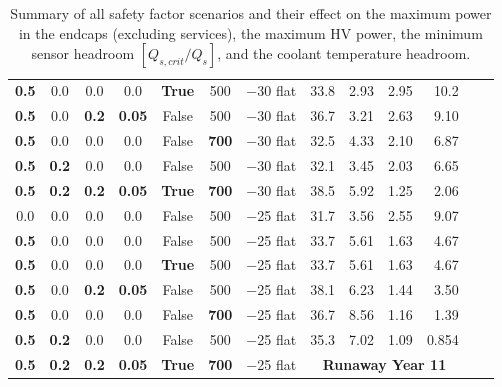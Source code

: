 \begin{table}[ht]
\begin{centering}
{\begin{tabular}{|ccccc|cc|rrrr|r|r|}
{\bf 0.5} & 0.0       & 0.0       & 0.0        & {\bf True} & 500       & $-$30 flat &      33.8 &    2.93 &      2.95 &       10.2 \\
{\bf 0.5} & 0.0       & {\bf 0.2} & {\bf 0.05} & False      & 500       & $-$30 flat &      36.7 &    3.21 &      2.63 &       9.10 \\
{\bf 0.5} & 0.0       & 0.0       & 0.0        & False      & {\bf 700} & $-$30 flat &      32.5 &    4.33 &      2.10 &       6.87 \\
{\bf 0.5} & {\bf 0.2} & 0.0       & 0.0        & False      & 500       & $-$30 flat &      32.1 &    3.45 &      2.03 &       6.65 \\
{\bf 0.5} & {\bf 0.2} & {\bf 0.2} & {\bf 0.05} & {\bf True} & {\bf 700} & $-$30 flat &      38.5 &    5.92 &      1.25 &       2.06 \\ \hline
0.0       & 0.0       & 0.0       & 0.0        & False      & 500       & $-$25 flat &      31.7 &    3.56 &      2.55 &       9.07 \\
{\bf 0.5} & 0.0       & 0.0       & 0.0        & False      & 500       & $-$25 flat &      33.7 &    5.61 &      1.63 &       4.67 \\
{\bf 0.5} & 0.0       & 0.0       & 0.0        & {\bf True} & 500       & $-$25 flat &      33.7 &    5.61 &      1.63 &       4.67 \\
{\bf 0.5} & 0.0       & {\bf 0.2} & {\bf 0.05} & False      & 500       & $-$25 flat &      38.1 &    6.23 &      1.44 &       3.50 \\
{\bf 0.5} & 0.0       & 0.0       & 0.0        & False      & {\bf 700} & $-$25 flat &      36.7 &    8.56 &      1.16 &       1.39 \\
{\bf 0.5} & {\bf 0.2} & 0.0       & 0.0        & False      & 500       & $-$25 flat &      35.3 &    7.02 &      1.09 &      0.854 \\
{\bf 0.5} & {\bf 0.2} & {\bf 0.2} & {\bf 0.05} & {\bf True} & {\bf 700} & $-$25 flat & \multicolumn{4}{c|}{\bf Runaway Year 11} \\
\hline\end{tabular}
} %
\caption{Summary of all safety factor scenarios and their effect on the maximum power in the
endcaps (excluding services), the maximum HV power, the minimum sensor headroom $[Q_{s,crit}/Q_s]$, and the coolant temperature headroom.}
\label{detailed_safety_table}
\end{centering}
\end{table}
